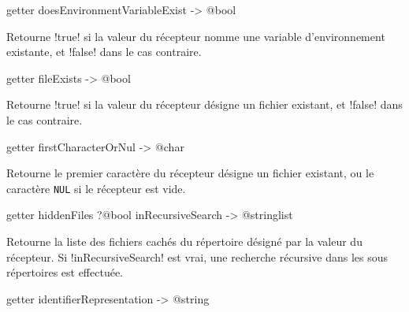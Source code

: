 
\begin{galgasbox}
getter doesEnvironmentVariableExist -> @bool
\end{galgasbox}

Retourne \ggs!true! si la valeur du récepteur nomme une variable d'environnement existante, et \ggs!false! dans le cas contraire.









\begin{galgasbox}
getter fileExists -> @bool
\end{galgasbox}

Retourne \ggs!true! si la valeur du récepteur désigne un fichier existant, et \ggs!false! dans le cas contraire.










\begin{galgasbox}
getter firstCharacterOrNul -> @char
\end{galgasbox}

Retourne le premier caractère du récepteur désigne un fichier existant, ou le caractère \texttt{NUL} si le récepteur est vide.









\begin{galgasbox}
getter hiddenFiles ?@bool inRecursiveSearch -> @stringlist
\end{galgasbox}

Retourne la liste des fichiers cachés du répertoire désigné par la valeur du récepteur. Si \ggs!inRecursiveSearch! est vrai, une recherche récursive dans les sous répertoires est effectuée.










\begin{galgasbox}
getter identifierRepresentation -> @string
\end{galgasbox}

